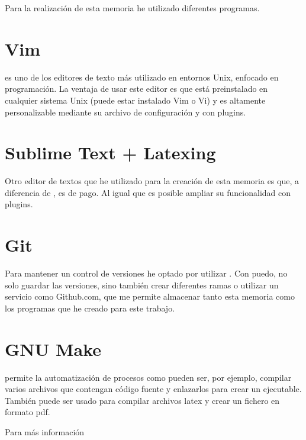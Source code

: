 
Para la realización de esta memoria he utilizado diferentes programas.

\section*{Vim}
 es uno de los editores de texto más utilizado en entornos Unix, enfocado en programación. La ventaja de usar este editor es que está preinstalado en cualquier sistema Unix (puede estar instalado Vim o Vi) y es altamente personalizable mediante su archivo de configuración y con plugins.

\section*{Sublime Text + Latexing}
Otro editor de textos que he utilizado para la creación de esta memoria es  que, a diferencia de , es de pago. Al igual que  es posible ampliar su funcionalidad con plugins.

\section*{Git}
Para mantener un control de versiones he optado por utilizar . Con  puedo, no solo guardar las versiones, sino también crear diferentes ramas o utilizar un servicio como Github.com, que me permite almacenar tanto esta memoria como los programas que he creado para este trabajo.

\section*{GNU Make}

 permite la automatización de procesos como pueden ser, por ejemplo, compilar varios archivos que contengan código fuente y enlazarlos para crear un ejecutable. También puede ser usado para compilar archivos latex y crear un fichero en formato pdf.

Para más información \cite{pdf:make}
